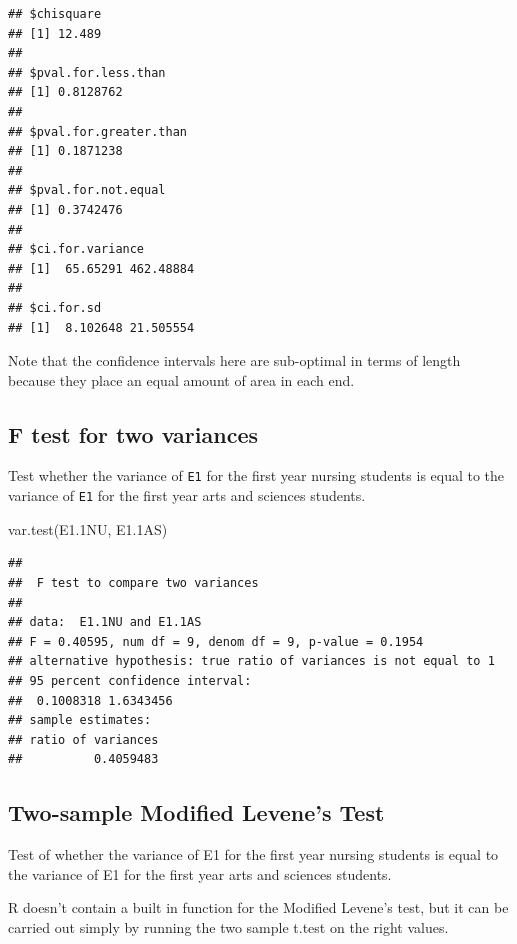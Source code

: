\documentclass[
]{book}
\newenvironment{Shaded}{\begin{snugshade}}{\end{snugshade}}
\newcommand{\FloatTok}[1]{\textcolor[rgb]{0.00,0.00,0.81}{#1}}
\newcommand{\FunctionTok}[1]{\textcolor[rgb]{0.00,0.00,0.00}{#1}}
\newcommand{\NormalTok}[1]{#1}
\begin{document}
\begin{verbatim}
## $chisquare
## [1] 12.489
## 
## $pval.for.less.than
## [1] 0.8128762
## 
## $pval.for.greater.than
## [1] 0.1871238
## 
## $pval.for.not.equal
## [1] 0.3742476
## 
## $ci.for.variance
## [1]  65.65291 462.48884
## 
## $ci.for.sd
## [1]  8.102648 21.505554
\end{verbatim}

Note that the confidence intervals here are sub-optimal in terms of length because they place an equal amount of area in each end.

\hypertarget{f-test-for-two-variances}{%
\subsection{F test for two variances}\label{f-test-for-two-variances}}

Test whether the variance of \texttt{E1} for the first year nursing students is equal to the variance of \texttt{E1} for the first year arts and sciences students.

\begin{Shaded}
\begin{Highlighting}[]
\FunctionTok{var.test}\NormalTok{(E1}\FloatTok{.1}\NormalTok{NU, E1}\FloatTok{.1}\NormalTok{AS)}
\end{Highlighting}
\end{Shaded}

\begin{verbatim}
## 
##  F test to compare two variances
## 
## data:  E1.1NU and E1.1AS
## F = 0.40595, num df = 9, denom df = 9, p-value = 0.1954
## alternative hypothesis: true ratio of variances is not equal to 1
## 95 percent confidence interval:
##  0.1008318 1.6343456
## sample estimates:
## ratio of variances 
##          0.4059483
\end{verbatim}

\hypertarget{two-sample-modified-levenes-test}{%
\subsection{Two-sample Modified Levene's Test}\label{two-sample-modified-levenes-test}}

Test of whether the variance of E1 for the first year nursing students is equal to the variance of E1 for the first year arts and sciences students.

R doesn't contain a built in function for the Modified Levene's test, but it can be carried out simply by running the two sample t.test on the right values.
\end{document}
